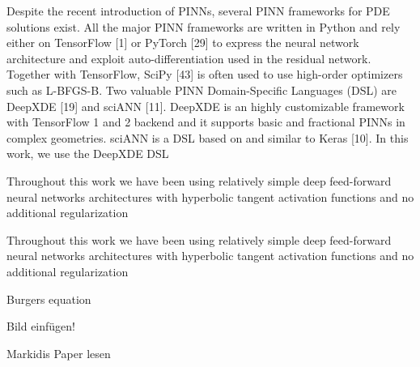 Despite the recent introduction of PINNs, several PINN frameworks for PDE solutions exist. All the major PINN
frameworks are written in Python and rely either on TensorFlow [1] or PyTorch [29] to express the neural network
architecture and exploit auto-differentiation used in the residual network. Together with TensorFlow, SciPy [43] is
often used to use high-order optimizers such as L-BFGS-B. Two valuable PINN Domain-Specific Languages (DSL) are
DeepXDE [19] and sciANN [11]. DeepXDE is an highly customizable framework with TensorFlow 1 and 2 backend and it
supports basic and fractional PINNs in complex geometries. sciANN is a DSL based on and similar to Keras [10]. In this
work, we use the DeepXDE DSL

Throughout this work we have been using relatively simple deep feed-forward neural networks architectures with hyperbolic tangent activation functions and no additional regularization









Throughout this work we have been using relatively simple deep feed-forward neural networks architectures with hyperbolic tangent activation functions and no additional regularization

Burgers equation

Bild einfügen!

Markidis Paper lesen